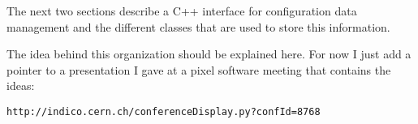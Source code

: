
The next two sections describe a C++ interface
for configuration data management and the
different classes that are used to store this
information. 

The idea behind this organization should be
explained here. For now I just add a pointer
to a presentation I gave at a pixel software
meeting that contains the ideas:
\begin{verbatim}
http://indico.cern.ch/conferenceDisplay.py?confId=8768
\end{verbatim}

